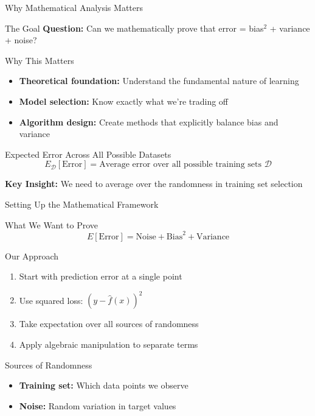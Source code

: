 \documentclass[10pt]{beamer}
\begin{document}
\begin{frame}{Why Mathematical Analysis Matters}
\begin{definitionbox}{The Goal}
\textbf{Question:} Can we mathematically prove that error = bias$^2$ + variance + noise?
\end{definitionbox}

\begin{keypointsbox}{Why This Matters}
\begin{itemize}
\item \textbf{Theoretical foundation:} Understand the fundamental nature of learning
\item \textbf{Model selection:} Know exactly what we're trading off
\item \textbf{Algorithm design:} Create methods that explicitly balance bias and variance
\end{itemize}
\end{keypointsbox}

\begin{examplebox}{Expected Error Across All Possible Datasets}
$$E_{\mathcal{D}}[\text{Error}] = \text{Average error over all possible training sets } \mathcal{D}$$
\end{examplebox}

\begin{alertbox}
\textbf{Key Insight:} We need to average over the randomness in training set selection
\end{alertbox}
\end{frame}

\begin{frame}{Setting Up the Mathematical Framework}
\begin{definitionbox}{What We Want to Prove}
$$E[\text{Error}] = \text{Noise} + \text{Bias}^2 + \text{Variance}$$
\end{definitionbox}

\begin{keypointsbox}{Our Approach}
\begin{enumerate}
\item Start with prediction error at a single point
\item Use squared loss: $(y - \hat{f}(x))^2$
\item Take expectation over all sources of randomness
\item Apply algebraic manipulation to separate terms
\end{enumerate}
\end{keypointsbox}

\begin{examplebox}{Sources of Randomness}
\begin{itemize}
\item \textbf{Training set:} Which data points we observe
\item \textbf{Noise:} Random variation in target values
\end{itemize}
\end{examplebox}
\end{frame}
\end{document}
